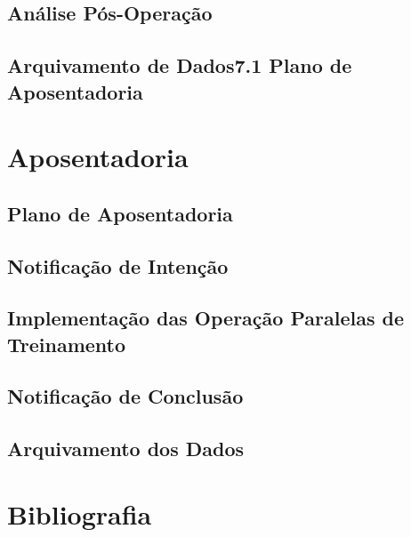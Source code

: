 \documentclass{article}
\begin{document}
	\subsection{Análise Pós-Operação}
	
	\subsection{Arquivamento de Dados7.1 Plano de Aposentadoria}
	
\section{Aposentadoria}

	\subsection{Plano de Aposentadoria}
	
	\subsection{Notificação de Intenção}
	
	\subsection{Implementação das Operação Paralelas de Treinamento}
	
	\subsection{Notificação de Conclusão}
	
	\subsection{Arquivamento dos Dados}  

\section{Bibliografia}
\end{document}
